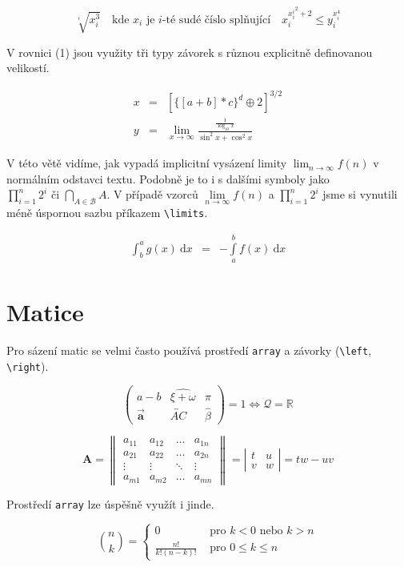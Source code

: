 \documentclass[a4paper, 11pt, twocolumn]{article}
\theoremstyle{definition}
\begin{document}
\begin{equation*}
\sqrt[i]{x_{i}^{3}} \quad \text {kde } x_{i} \text { je } i \text {-té sudé číslo splňující} \quad x_{i}^{{{x_{i}^i}^2}+2} \leq y_{i}^{x_{i}^{4}}
\end{equation*}

V rovnici (1) jsou využity tři typy závorek s různou
explicitně definovanou velikostí.

\begin{eqnarray}
x & = & \left[\Big\{[a+b] * c\Big\}^{d} \oplus 2\right]^{3 / 2} \\
y & = & \lim_{x \rightarrow \infty} \frac{\frac{1}{\log _{10} x}}{\sin ^{2} x+\cos ^{2} x} \nonumber
\end{eqnarray}

V této větě vidíme, jak vypadá implicitní vysázení limity $\lim_{n \rightarrow \infty} f(n)$ v normálním odstavci textu. Podobně je to i s dalšími symboly jako
$\prod_{i=1}^{n} 2^{i} \text{ či } \bigcap_{A \in \mathcal{B}} A$. V případě vzorců $\lim\limits_{n \rightarrow \infty} f(n)$ a $\prod\limits_{i=1}^{n} 2^{i}$ 
jsme si vynutili méně úspornou sazbu příkazem \verb$\limits$.

\begin{eqnarray}
\int_{b}^{a} g(x)~\mathrm{d} x & = & -\int\limits_{a}^{b} f(x)~\mathrm{d} x
\end{eqnarray}

\section{Matice}
Pro sázení matic se velmi často používá prostředí \verb$array$ a závorky (\verb$\left$, \verb$\right$).

\begin{equation*}
\left(\begin{array}{ccc}
a - b & \widehat{\xi+\omega} & \pi \\
\vec{\mathbf{a}} & \overleftrightarrow{A C} & \hat{\beta}
\end{array}\right) = 1 \Longleftrightarrow \mathcal{Q} = \mathbb{R}
\end{equation*}

\begin{equation*}
\mathbf{A}=\left\|\begin{array}{cccc}
a_{11} & a_{12} & \ldots & a_{1 n} \\
a_{21} & a_{22} & \ldots & a_{2 n} \\
\vdots & \vdots & \ddots & \vdots \\
a_{m 1} & a_{m 2} & \ldots & a_{m n}
\end{array}\right\|=\left|\begin{array}{cc}
t & u \\
v & w
\end{array}\right|=t w-u v
\end{equation*}

Prostředí \verb$array$ lze úspěšně využít i jinde.

\begin{equation*}
\binom{n}{k} = \left\{\begin{array}{cl}
0 & \text { pro } k<0 \text { nebo } k>n \\
\frac{n !}{k !(n-k) !} & \text { pro } 0 \leq k \leq n
\end{array}\right.
\end{equation*}
\end{document}
